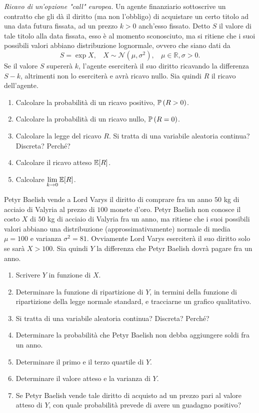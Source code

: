 \textit{Ricavo di un'opzione "call" europea.} Un agente finanziario sottoscrive un contratto che gli dà il diritto (ma non l'obbligo) di acquistare un certo titolo ad una data futura fissata, ad un prezzo $k >0$ anch'esso fissato. Detto $S$ il valore di tale titolo alla data fissata, esso è al momento sconosciuto, ma si ritiene che i suoi possibili valori abbiano distribuzione lognormale, ovvero che siano dati da
\begin{equation*}
S=\exp X,\ \ \ \ X\sim \mathcal{N}\left(\mu ,\sigma^{2}\right) ,\ \ \ \ \mu \in \mathbb{R} ,\sigma  >0.
\end{equation*}
Se il valore $S$ supererà $k$, l'agente eserciterà il suo diritto ricavando la differenza $S-k$, altrimenti non lo eserciterà e avrà ricavo nullo. Sia quindi $R$ il ricavo dell'agente.
\begin{enumerate}
\item Calcolare la probabilità di un ricavo positivo, $\mathbb{P}\left(R >0\right)$.
\item Calcolare la probabilità di un ricavo nullo, $\mathbb{P}\left(R=0\right)$.
\item Calcolare la legge del ricavo $R$. Si tratta di una variabile aleatoria continua? Discreta? Perché?
\item Calcolare il ricavo atteso $\mathbb{E}[R]$.
\item Calcolare $\lim\limits_{k\rightarrow 0}\mathbb{E}[R]$.
\end{enumerate}
\Esercizio{}

Petyr Baelish vende a Lord Varys il diritto di comprare fra un anno $50$ kg di acciaio di Valyria al prezzo di $100$ monete d'oro. Petyr Baelish non conosce il costo $X$ di $50$ kg di acciaio di Valyria fra un anno, ma ritiene che i suoi possibili valori abbiano una distribuzione (approssimativamente) normale di media $\mu =100$ e varianza $\sigma^{2} =81$. Ovviamente Lord Varys eserciterà il suo diritto solo se sarà $X >100$. Sia quindi $Y$ la differenza che Petyr Baelish dovrà pagare fra un anno.
\begin{enumerate}
\item Scrivere $Y$ in funzione di $X$.
\item Determinare la funzione di ripartizione di $Y$, in termini della funzione di ripartizione della legge normale standard, e tracciarne un grafico qualitativo.
\item Si tratta di una variabile aleatoria continua? Discreta? Perché?
\item Determinare la probabilità che Petyr Baelish non debba aggiungere soldi fra un anno.
\item Determinare il primo e il terzo quartile di $Y$.
\item Determinare il valore atteso e la varianza di $Y$.
\item Se Petyr Baelish vende tale diritto di acquisto ad un prezzo pari al valore atteso di $Y$, con quale probabilità prevede di avere un guadagno positivo?
\end{enumerate}
\Esercizio{}

